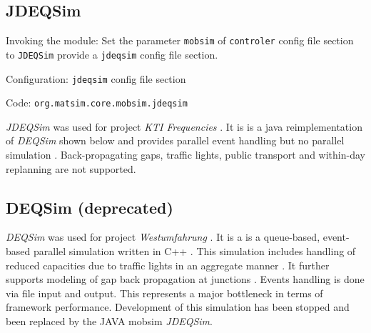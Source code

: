 \subsection{JDEQSim}
\label{sec:jdeqsim}
\begin{compactitem}
\item Invoking the module: Set the parameter \lstinline|mobsim| of \lstinline|controler| config file section to \lstinline|JDEQSim| provide a \lstinline|jdeqsim| config file section.
\item Configuration: \lstinline|jdeqsim| config file section
\item Code: \lstinline|org.matsim.core.mobsim.jdeqsim|
\end{compactitem}

\emph{JDEQSim} \citep[][]{WaraichEtAl_TechRep_IVT_2009, WaraichEtAl_STRC_2009} was used for project \emph{KTI Frequencies} \citep[][]{BalmerEtAl_ResRep_datapuls_2010}. It is is a java reimplementation of \emph{DEQSim} shown below \citep[][]{WaraichEtAl_STRC_2009, CharyparEtAl_TRR_2007, CharyparEtAl_TRB_2009} and provides parallel event handling but no parallel simulation \citep[][p.11]{BalmerEtAl_ResRep_datapuls_2010}. Back-propagating gaps, traffic lights, public transport and within-day replanning are not supported.


\subsection{DEQSim (deprecated)}
\label{sec:deqsim}
\emph{DEQSim} was used for project \emph{Westumfahrung} \citep[][]{BalmerEtAl_ResRep_bdktzrh_2009}. It is a is a queue-based, event-based parallel simulation written in C++ \citep[][]{CharyparEtAl_TRR_2007, Charypar_PhDThesis_2008}. This simulation includes handling of reduced capacities due to traffic lights in an aggregate manner \citep[][p.139 ff]{Charypar_PhDThesis_2008}. It further supports modeling of gap back propagation at junctions \citep[][p.98 ff]{Charypar_PhDThesis_2008}. Events handling is done via file input and output. This represents a major bottleneck in terms of framework performance. Development of this simulation has been stopped and been replaced by the JAVA mobsim \emph{JDEQSim}.

